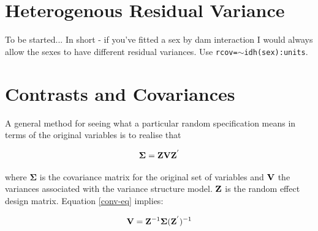 \documentclass{article}
\begin{document}
\begin{landscape}
\begin{table}
\begin{center}
\begin{tabular}{ccccc}
\right]$\\
\\
\hline
\end{tabular}
\end{center}
\caption{Different random effect specifications in \texttt{lmer}, \texttt{MCMCglmm} and \texttt{asreml}. \texttt{sex} is a factor with three levels so the resulting matrix is $3\times3$. Continuous variables can also go on the LHS of the pipe, or within the variance structure functions (e.g. \texttt{us},\texttt{idh}). In this case the associated parameters are regression coefficients for which a variance is estimated. For example, if the chicks were of different ages (or we'd measured the same chicks at different ages) we may want to see if the growth rate is more similar for chicks raised by the same mother. \texttt{(1+age|dam)} or \texttt{us(1+age):dam} estimates a $2\times2$ matrix which includes the variance in intercepts (when \texttt{age}=0), the variance in slopes, and the covariance that exists between them.}
\label{rspec}
\end{table}
\end{landscape}

\section{Heterogenous Residual Variance}
\label{heter-sec}
To be started... In short - if you've fitted a sex by dam interaction I would always allow the sexes to have different residual variances. Use \texttt{rcov=$\sim$idh(sex):units}.

\section{Contrasts and Covariances}

A general method for seeing what a particular random specification means in terms of the original variables is to realise that 

\begin{equation}
{\bm \Sigma} = {\bf Z}{\bf V}{\bf Z}^{'}
\label{conv-eq}
\end{equation}

where ${\bm \Sigma}$ is the covariance matrix for the original set of variables and ${\bf V}$ the variances associated with the variance structure model. ${\bf Z}$ is the random effect design matrix. Equation \ref{conv-eq} implies:

\begin{equation}
{\bf V} = {\bf Z}^{-1}{\bm \Sigma}({\bf Z}^{'})^{-1}
\end{equation}
\end{document}
